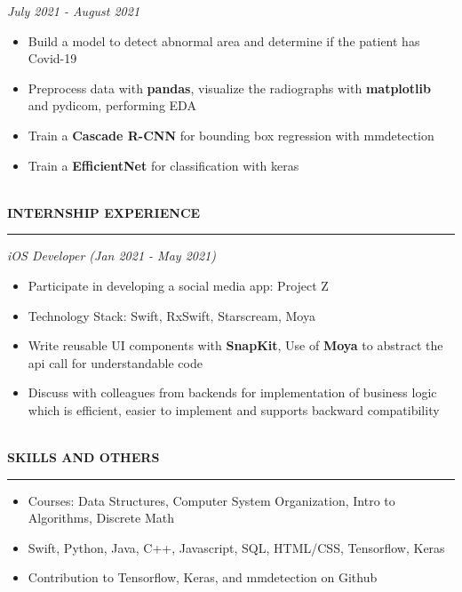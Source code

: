 \documentclass{article}
\begin{document}
\emph{July 2021 - August 2021}
\begin{itemize}[leftmargin=*,topsep=0pt]
\item Build a model to detect abnormal area and determine if the patient has Covid-19
\item Preprocess data with \textbf{pandas}, visualize the radiographs with \textbf{matplotlib} and pydicom, performing EDA
\item Train a \textbf{Cascade R-CNN} for bounding box regression with mmdetection
\item Train a \textbf{EfficientNet} for classification with keras

\end{itemize} \ \\ 
\noindent
{\textbf{INTERNSHIP EXPERIENCE}}\newline
\rule{\textwidth}{1pt}\newline
\emph{iOS Developer (Jan 2021 - May 2021)}
\begin{itemize}[leftmargin=*,topsep=0pt]
\item Participate in developing a social media app: Project Z
\item Technology Stack: Swift, RxSwift, Starscream, Moya
\item Write reusable UI components with \textbf{SnapKit}, Use of \textbf{Moya} to abstract the api call for understandable code
\item Discuss with colleagues from backends for implementation of business logic which is efficient, easier to implement and supports backward compatibility

\end{itemize} \ \\ 
\noindent
{\textbf{SKILLS AND OTHERS}}\newline
\rule{\textwidth}{1pt}\begin{itemize}[leftmargin=*,topsep=0pt]
\item Courses: Data Structures, Computer System Organization, Intro to Algorithms, Discrete Math
\item Swift, Python, Java, C++, Javascript, SQL, HTML/CSS, Tensorflow, Keras
\item Contribution to Tensorflow, Keras, and mmdetection on Github

\end{itemize} \ \\ 
\end{document}
